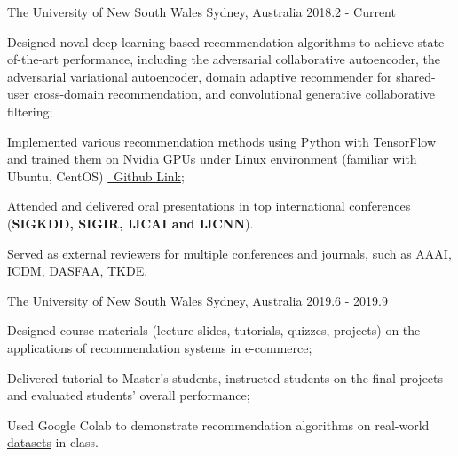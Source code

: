 

\begin{cventries}

  \newcommand{\exptopskip}{0mm}
  \newcommand{\expbottomskip}{-2mm}

  \cventry[bottom=\expbottomskip, top=\exptopskip]
  {Ph.D. Student} %
  {The University of New South Wales} %
  {Sydney, Australia} %
  {2018.2 - Current} %
  {
    \begin{cvitems} %
      \item Designed noval deep learning-based recommendation algorithms to achieve state-of-the-art performance, including the adversarial collaborative autoencoder, the adversarial variational autoencoder, domain adaptive recommender for shared-user cross-domain recommendation, and convolutional generative collaborative filtering;
      \item Implemented various recommendation methods using Python with TensorFlow and trained them on Nvidia GPUs under Linux environment (familiar with Ubuntu, CentOS) \href{https://github.com/bennetyf/RecSys}{\faGithub~Github Link};
      \item Attended and delivered oral presentations in top international conferences (\textbf{SIGKDD, SIGIR, IJCAI and IJCNN}).
      \item Served as external reviewers for multiple conferences and journals, such as AAAI, ICDM, DASFAA, TKDE.
    \end{cvitems}
  }

  \cventry[top=\exptopskip,bottom=\expbottomskip]
    {Tutor} %
    {The University of New South Wales} %
    {Sydney, Australia} %
    {2019.6 - 2019.9} %
    {
      \begin{cvitems} %
        \item Designed course materials (lecture slides, tutorials, quizzes, projects) on the applications of recommendation systems in e-commerce;
        \item Delivered tutorial to Master's students, instructed students on the final projects and evaluated students' overall performance;
        \item Used Google Colab to demonstrate recommendation algorithms on real-world \href{http://cseweb.ucsd.edu/~jmcauley/datasets.html}{\underline{datasets}} in class.
      \end{cvitems}
  }


\end{cventries}
